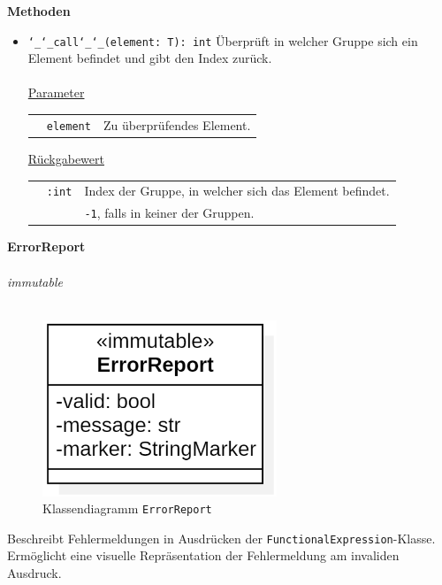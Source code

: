 \documentclass{article}
\begin{document}
\textbf{Methoden}
\begin{itemize}
\item \texttt{\char`_\char`_call\char`_\char`_(element: T): int} \newline Überprüft in welcher Gruppe sich ein Element befindet und gibt den Index zurück.
\\\\
\underline{{Parameter}}

\begin{tabular}{lll}
 & \texttt{element} & Zu überprüfendes Element. \\
\end{tabular}

\underline{Rückgabewert}

\begin{tabular}{lll}
 & \texttt{:int} & Index der Gruppe, in welcher sich das Element befindet. \\
 && \texttt{-1}, falls in keiner der Gruppen.\\
\end{tabular}
\end{itemize}


\newpage
\textbf{\large{ErrorReport}}\\\\
\textit{\flqq{}immutable\frqq}\normalsize\\\\
\begin{figure}[H]%
    \centering
    \includegraphics[width=7cm]{entwurf/Entwurf_dokument/img/cls/model/ErrorReport.png}
    \caption{Klassendiagramm \texttt{ErrorReport}}
\end{figure}

Beschreibt Fehlermeldungen in Ausdrücken der \texttt{FunctionalExpression}-Klasse. \\ Ermöglicht eine visuelle Repräsentation der Fehlermeldung am invaliden Ausdruck.
\newline \newline
\end{document}
